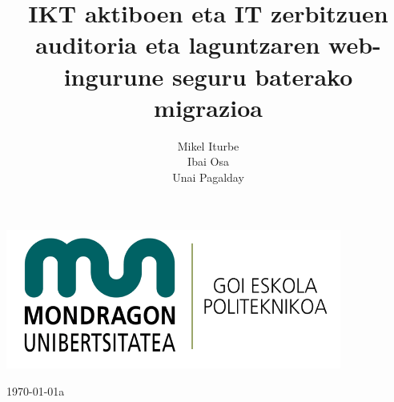 \title{\textbf{IKT aktiboen eta IT zerbitzuen auditoria eta laguntzaren web-ingurune seguru baterako migrazioa}}
\author{Mikel Iturbe \\ Ibai Osa \\ Unai Pagalday}%
\date{}

\maketitle
\begin{center}
\bigskip
 \includegraphics[scale=0.20]{irudiak/mgeplogo2.png}
\bigskip

 \today{}a
\end{center}



\thispagestyle{empty} %